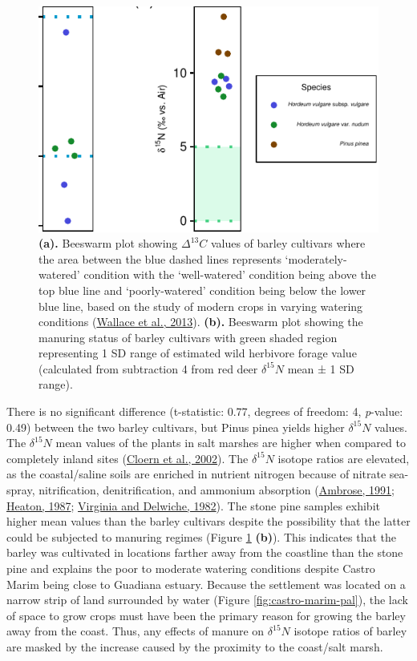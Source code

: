 \documentclass[preprint, 3p, authoryear]{elsarticle} %
\begin{document}
\begin{figure}
\centering
\includegraphics{RPaladuguetal_Castro_files/figure-latex/iso-hord-plots-1.pdf}
\caption{\label{fig:iso-hord-plots}\textbf{(a).} Beeswarm plot showing \(\Delta ^{13}C\) values of barley cultivars where the area between the blue dashed lines represents `moderately-watered' condition with the `well-watered' condition being above the top blue line and `poorly-watered' condition being below the lower blue line, based on the study of modern crops in varying watering conditions (\protect\hyperlink{ref-wallace_etal13}{Wallace et al., 2013}). \textbf{(b).} Beeswarm plot showing the manuring status of barley cultivars with green shaded region representing 1 SD range of estimated wild herbivore forage value (calculated from subtraction 4 \text{\textperthousand} from red deer \(\delta ^{15}N\) mean ± 1 SD range).}
\end{figure}

There is no significant difference (t-statistic: 0.77, degrees of freedom: 4, \emph{p}-value: 0.49) between the two barley cultivars, but Pinus pinea yields higher \(\delta ^{15}N\) values. The \(\delta ^{15}N\) mean values of the plants in salt marshes are higher when compared to completely inland sites (\protect\hyperlink{ref-cloern_etal02}{Cloern et al., 2002}). The \(\delta ^{15}N\) isotope ratios are elevated, as the coastal/saline soils are enriched in nutrient nitrogen because of nitrate sea-spray, nitrification, denitrification, and ammonium absorption (\protect\hyperlink{ref-ambrose91}{Ambrose, 1991}; \protect\hyperlink{ref-heaton87}{Heaton, 1987}; \protect\hyperlink{ref-virginia_delwiche82}{Virginia and Delwiche, 1982}). The stone pine samples exhibit higher mean values than the barley cultivars despite the possibility that the latter could be subjected to manuring regimes (Figure \ref{fig:iso-hord-plots} \textbf{(b)}). This indicates that the barley was cultivated in locations farther away from the coastline than the stone pine and explains the poor to moderate watering conditions despite Castro Marim being close to Guadiana estuary. Because the settlement was located on a narrow strip of land surrounded by water (Figure \ref{fig:castro-marim-pal}), the lack of space to grow crops must have been the primary reason for growing the barley away from the coast. Thus, any effects of manure on \(\delta ^{15}N\) isotope ratios of barley are masked by the increase caused by the proximity to the coast/salt marsh.
\end{document}
